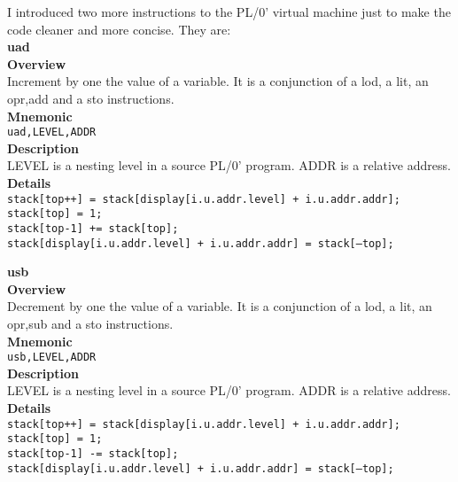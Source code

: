 \documentclass{article}
\begin{document}
I introduced two more instructions to the PL/0' virtual machine just to make
the code cleaner and more concise. They are:\\

\noindent\textbf{\Large uad}\\

\noindent\textbf{Overview}\\
\indent Increment by one the value of a variable. It is  a conjunction of
a lod, a lit, an opr,add and a sto instructions.\\

\noindent\textbf{Mnemonic}\\
\indent \texttt{uad,LEVEL,ADDR}\\

\noindent\textbf{Description}\\
\indent LEVEL is a nesting level in a source PL/0' program.
 ADDR is a relative address.\\

\noindent\textbf{Details}\\
\indent \texttt{stack[top++] = stack[display[i.u.addr.level] + i.u.addr.addr];\\
\indent stack[top] = 1;\\
\indent stack[top-1] += stack[top];\\
\indent stack[display[i.u.addr.level] + i.u.addr.addr] = stack[--top];}\\

\vspace{0.5cm}

\noindent\textbf{\Large usb}\\

\noindent\textbf{Overview}\\
\indent Decrement by one the value of a variable. It is a conjunction of
a lod, a lit, an opr,sub and a sto instructions.\\

\noindent\textbf{Mnemonic}\\
\indent \texttt{usb,LEVEL,ADDR}\\

\noindent\textbf{Description}\\
\indent LEVEL is a nesting level in a source PL/0' program.
 ADDR is a relative address.\\

\noindent\textbf{Details}\\
\indent \texttt{stack[top++] = stack[display[i.u.addr.level] +
    i.u.addr.addr];\\
\indent stack[top] = 1;\\
\indent stack[top-1] -= stack[top];\\
\indent stack[display[i.u.addr.level] + i.u.addr.addr] = stack[--top];}\\
\end{document}
